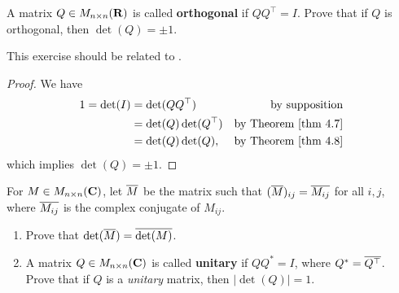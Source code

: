 \begin{exercise} \label{exercise 4.3.12}
A matrix \(Q \in M_{n \times n}(\mathbf{R})\) is called \textbf{orthogonal} if \(QQ^\top = I\).
Prove that if \(Q\) is orthogonal, then \(\det(Q) = \pm 1\).
\end{exercise}

\begin{note}
This exercise should be related to .
\end{note}

\begin{proof}
We have
\begin{align*}
    1 = \det(I) & = \det(QQ^\top) & \text{by supposition} \\
                & = \det(Q) \det(Q^\top) & \text{by \THM{4.7}} \\
                & = \det(Q) \det(Q), & \text{by \THM{4.8}} \\
\end{align*}
which implies \(\det(Q) = \pm 1\).
\end{proof}

\begin{exercise} \label{exercise 4.3.13}
For \(M \in M_{n \times n}(\mathbf{C})\), let \(\overline{M}\) be the matrix such that \((\overline{M})_{ij} = \overline{M_{ij}}\) for all \(i, j\),
where \(\overline{M_{ij}}\) is the complex conjugate of \(M_{ij}\).
\begin{enumerate}
\item Prove that \(\det(\overline{M}) = \overline{\det(M)}\).

\item A matrix \(Q \in M_{n \times n}(\mathbf{C})\) is called \textbf{unitary} if \(QQ^* = I\), where \(Q^* = \overline{Q^\top}\).
Prove that if \(Q\) is a \emph{unitary} matrix, then \(\left| \det(Q) \right| = 1\).
\end{enumerate}
\end{exercise}

